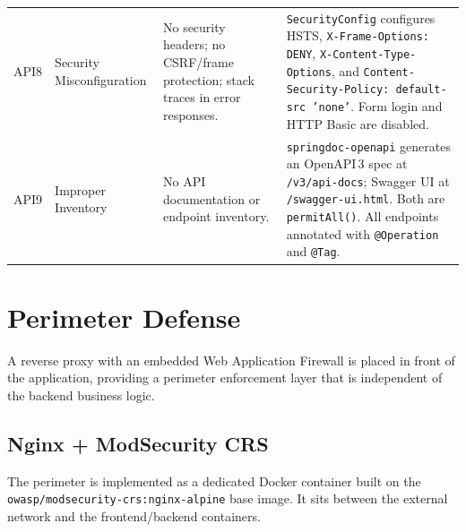 \documentclass[12pt,a4paper]{report}
\begin{document}
\begin{longtable}{S{1.3cm} S{2.1cm} S{4.8cm} S{5.4cm}}
API8 & Security Misconfiguration & No security headers; no CSRF/frame protection; stack traces in error responses. &
\texttt{SecurityConfig} configures HSTS, \texttt{X-Frame-Options: DENY}, \texttt{X-Content-Type-Options}, and \texttt{Content-Security-Policy: default-src 'none'}. Form login and HTTP Basic are disabled. \\[6pt]

API9 & Improper Inventory & No API documentation or endpoint inventory. &
\texttt{springdoc-openapi} generates an OpenAPI\,3 spec at \texttt{/v3/api-docs}; Swagger UI at \texttt{/swagger-ui.html}. Both are \texttt{permitAll()}. All endpoints annotated with \texttt{@Operation} and \texttt{@Tag}. \\
\end{longtable}

\section{Perimeter Defense}

A reverse proxy with an embedded Web Application Firewall is placed in front of the
application, providing a perimeter enforcement layer that is independent of the backend
business logic.

\subsection{Nginx + ModSecurity CRS}

The perimeter is implemented as a dedicated Docker container built on the
\texttt{owasp/modsecurity-crs:nginx-alpine} base image. It sits between the external
network and the frontend/backend containers.
\end{document}
